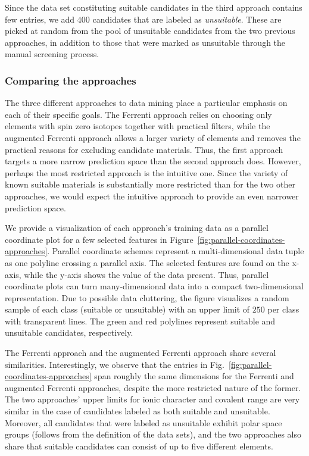 \documentclass[superscriptaddress,unsortedaddress,
 amsmath,amssymb,
 aps,
]{revtex4-2}
\begin{document}
Since the data set constituting suitable candidates in the third approach contains few entries, we add $400$ candidates that are labeled as \emph{unsuitable}. These are picked at random from the pool of unsuitable candidates from the two previous approaches, in addition to those that were marked as unsuitable through the manual screening process. 

\subsubsection*{Comparing the approaches}
The three different approaches to data mining place a particular emphasis on each of their specific goals. The Ferrenti approach relies on choosing only elements with spin zero isotopes together with practical filters, while the augmented Ferrenti approach allows a larger variety of elements and removes the practical reasons for excluding candidate materials. Thus, the first approach targets a more narrow prediction space than the second approach does. However, perhaps the most restricted approach is the intuitive one. Since the variety of known suitable materials is substantially more restricted than for the two other approaches, we would expect the intuitive approach to provide an even narrower prediction space. %

We provide a visualization of each approach's training data as a parallel coordinate plot for a few selected features in Figure~\ref{fig:parallel-coordinates-approaches}. Parallel coordinate schemes \cite{Inselberga1990, Inselberg1985} represent a multi-dimensional data tuple as one polyline crossing a parallel axis. The selected features are found on the x-axis, while the y-axis shows the value of the data present. Thus, parallel coordinate plots can turn many-dimensional data into a compact two-dimensional representation. Due to possible data cluttering, the figure visualizes a random sample of each class (suitable or unsuitable) with an upper limit of $250$ per class with transparent lines. The green and red polylines represent suitable and unsuitable candidates, respectively. 

The Ferrenti approach and the augmented Ferrenti approach share several similarities. 
Interestingly, we observe that the entries in Fig.~\ref{fig:parallel-coordinates-approaches} span roughly the same dimensions for the Ferrenti and augmented Ferrenti approaches, despite the more restricted nature of the former.  
The two approaches' upper limits for ionic character and covalent range are very similar in the case of candidates labeled as both suitable and unsuitable.   
Moreover, all candidates that were labeled as unsuitable exhibit polar space groups (follows from the definition of the data sets), and the two approaches also share that suitable candidates can consist of up to five different elements. 
\end{document}
